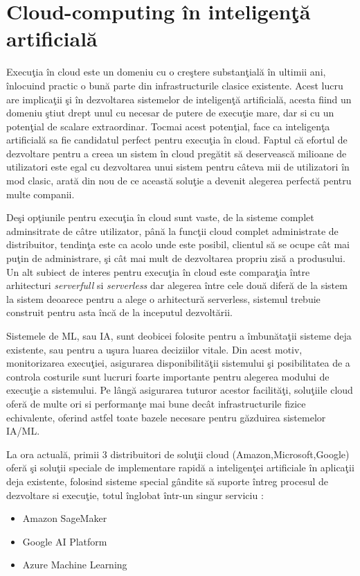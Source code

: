 \documentclass[a4paper,12pt]{report}
\begin{document}
\section{Cloud-computing în inteligenţă artificială}
\quad Execuţia în cloud este un domeniu cu o creştere substanţială în ultimii ani, înlocuind practic o bună parte din infrastructurile clasice existente. Acest lucru are implicaţii şi în dezvoltarea sistemelor de inteligenţă artificială, acesta fiind un domeniu ştiut drept unul cu necesar de putere de execuţie mare, dar si cu un potenţial de scalare extraordinar. Tocmai acest potenţial, face ca inteligenţa artificială sa fie candidatul perfect pentru execuţia în cloud. Faptul că efortul de dezvoltare pentru a creea un sistem în cloud pregătit să deservească milioane de utilizatori este egal cu dezvoltarea unui sistem pentru câteva mii de utilizatori în mod clasic, arată din nou de ce această soluţie a devenit alegerea perfectă pentru multe companii.
\par Deşi opţiunile pentru execuţia în cloud sunt vaste, de la sisteme complet adminsitrate de câtre utilizator, până la funcţii cloud complet administrate de distribuitor, tendinţa este ca acolo unde este posibil, clientul să se ocupe cât mai puţin de administrare, şi cât mai mult de dezvoltarea propriu zisă a produsului. Un alt subiect de interes pentru execuţia în cloud este comparaţia între arhitecturi \emph{serverfull} si \emph{serverless} dar alegerea între cele două diferă de la sistem la sistem deoarece pentru a alege o arhitectură serverless, sistemul trebuie construit pentru asta încă de la inceputul dezvoltării. 
\par Sistemele de ML, sau IA, sunt deobicei folosite pentru a îmbunătaţii sisteme deja existente, sau pentru a uşura luarea deciziilor vitale. Din acest motiv, monitorizarea execuţiei, asigurarea disponibilităţii sistemului şi posibilitatea de a controla costurile sunt lucruri foarte importante pentru alegerea modului de execuţie a sistemului. Pe lângă asigurarea tuturor acestor facilităţi, soluţiile cloud oferă de multe ori si performanţe mai bune decât infrastructurile fizice echivalente, oferind astfel toate bazele necesare pentru găzduirea sistemelor IA/ML.
\newpage
\par La ora actuală, primii 3 distribuitori de soluţii cloud (Amazon,Microsoft,Google) oferă şi soluţii speciale de implementare rapidă a inteligenţei artificiale în aplicaţii deja existente, folosind sisteme special gândite să suporte întreg procesul de dezvoltare si execuţie, totul înglobat într-un singur serviciu :
\begin{itemize}
\item Amazon SageMaker
\item Google AI Platform
\item Azure Machine Learning
\end{itemize} 
\end{document}
